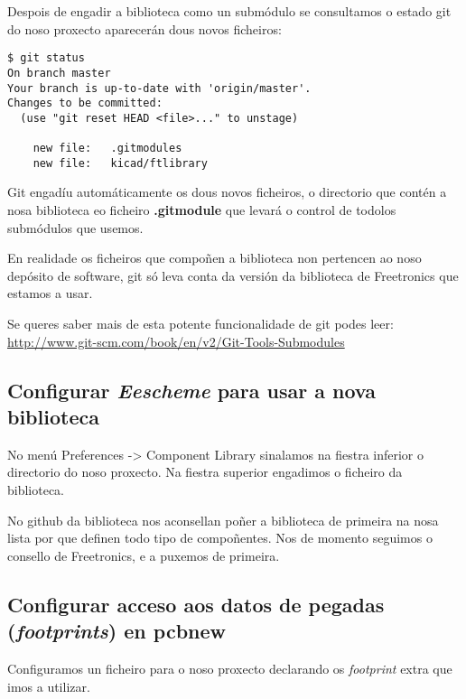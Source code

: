 Despois de engadir a biblioteca como un submódulo se consultamos o
estado git do noso proxecto aparecerán dous novos ficheiros:

\begin{verbatim}
$ git status
On branch master
Your branch is up-to-date with 'origin/master'.
Changes to be committed:
  (use "git reset HEAD <file>..." to unstage)

    new file:   .gitmodules
    new file:   kicad/ftlibrary
\end{verbatim}

Git engadíu automáticamente os dous novos ficheiros, o directorio que
contén a nosa biblioteca eo ficheiro \textbf{.gitmodule} que levará o
control de todolos submódulos que usemos.

En realidade os ficheiros que compoñen a biblioteca non pertencen ao
noso depósito de software, git só leva conta da versión da biblioteca de
Freetronics que estamos a usar.

Se queres saber mais de esta potente funcionalidade de git podes leer:
\url{http://www.git-scm.com/book/en/v2/Git-Tools-Submodules}

\subsection{\texorpdfstring{Configurar \emph{Eescheme} para usar a nova
biblioteca}{Configurar Eescheme para usar a nova biblioteca}}\label{configurar-eescheme-para-usar-a-nova-biblioteca}

No menú Preferences -\textgreater{} Component Library sinalamos na
fiestra inferior o directorio do noso proxecto. Na fiestra superior
engadimos o ficheiro da biblioteca.

No github da biblioteca nos aconsellan poñer a biblioteca de primeira na
nosa lista por que definen todo tipo de compoñentes. Nos de momento
seguimos o consello de Freetronics, e a puxemos de primeira.

\subsection{\texorpdfstring{Configurar acceso aos datos de pegadas
(\emph{footprints}) en
pcbnew}{Configurar acceso aos datos de pegadas (footprints) en pcbnew}}\label{configurar-acceso-aos-datos-de-pegadas-footprints-en-pcbnew}

Configuramos un ficheiro para o noso proxecto declarando os
\emph{footprint} extra que imos a utilizar.

